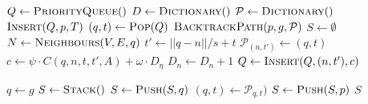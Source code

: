 \begin{algorithm}[ht]
    \caption{$\Function{SearchGraph}(V, E, R, A, p, g, T)$}
    \label{algo:search}
    \begin{algorithmic}[1]
        \setcounter{ALC@line}{0}
        \vspace*{1mm}
        \STATE $Q \leftarrow \Function{PriorityQueue}()$
        \STATE $D \leftarrow \Function{Dictionary}()$
        \STATE $\mathcal{P} \leftarrow \Function{Dictionary}()$
        \STATE $\Function{Insert}(Q, p, T)$
            \STATE $(q, t) \leftarrow \Function{Pop}(Q)$
                \RETURN $\Function{BacktrackPath}(p, g, \mathcal{P})$
            \ENDIF
            \STATE $S \leftarrow \emptyset$
            \STATE $N \leftarrow \Function{Neighbours}(V, E, q)$
                \STATE $t' \leftarrow ||q - n|| / s + t$
                \STATE $\mathcal{P}_{(n, t')} \leftarrow (q, t)$
                \STATE $c \leftarrow \psi \cdot C(q, n, t, t', A) + \omega
                    \cdot D_{\eta}$
                \STATE $D_{n} \leftarrow D_{n} + 1$
                \STATE $Q \leftarrow \Function{Insert}(Q, (n, t'), c)$
            \ENDFOR
        \ENDWHILE
    \end{algorithmic}
\end{algorithm}

\begin{algorithm}[ht]
    \caption{$\Function{BacktrackPath}(p, g, \mathcal{P})$}
    \label{algo:backtrack}
    \begin{algorithmic}[1]
        \setcounter{ALC@line}{0}
        \vspace*{1mm}
        \STATE $q \leftarrow g$
        \STATE $S \leftarrow \Function{Stack}()$
            \STATE $S \leftarrow \Function{Push}(S, q)$
            \STATE $(q, t) \leftarrow \mathcal{P}_{q, t})$
        \ENDWHILE
        \STATE $S \leftarrow \Function{Push}(S, p)$
        \RETURN $S$
    \end{algorithmic}
\end{algorithm}

